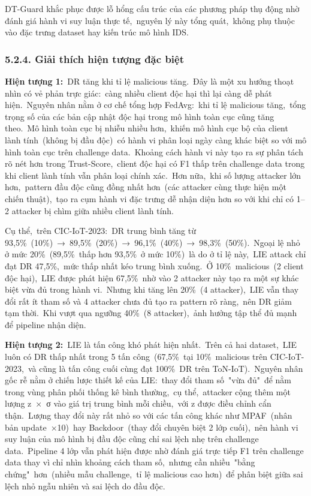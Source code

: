 DT-Guard khắc phục được lỗ hổng cấu trúc của các phương pháp thụ động nhờ đánh giá hành vi suy luận thực tế,~nguyên lý này tổng quát,~không phụ thuộc vào đặc trưng dataset hay kiến trúc mô hình IDS.

\subsubsection{5.2.4. Giải thích hiện tượng đặc biệt}\label{giux1ea3i-thuxedch-hiux1ec7n-tux1b0ux1ee3ng-ux111ux1eb7c-biux1ec7t}

\textbf{Hiện tượng 1:}~DR tăng khi tỉ lệ malicious tăng.~Đây là một xu hướng thoạt nhìn có vẻ phản trực giác:~càng nhiều client độc hại thì lại càng dễ phát hiện.~Nguyên nhân nằm ở cơ chế tổng hợp FedAvg:~khi tỉ lệ malicious tăng,~tổng trọng số của các bản cập nhật độc hại trong mô hình toàn cục cũng tăng theo.~Mô hình toàn cục bị nhiễu nhiều hơn,~khiến mô hình cục bộ của client lành tính~(không bị đầu độc)~có hành vi phân loại ngày càng khác biệt so với mô hình toàn cục trên challenge data.~Khoảng cách hành vi này tạo ra sự phân tách rõ nét hơn trong Trust-Score,~client độc hại có F1 thấp trên challenge data trong khi client lành tính vẫn phân loại chính xác.~Hơn nữa,~khi số lượng attacker lớn hơn,~pattern đầu độc cũng đồng nhất hơn~(các attacker cùng thực hiện một chiến thuật),~tạo ra cụm hành vi đặc trưng dễ nhận diện hơn so với khi chỉ có 1--2 attacker bị chìm giữa nhiều client lành tính.

Cụ thể,~trên CIC-IoT-2023:~DR trung bình tăng từ 93,5\%~(10\%)~→~89,5\%~(20\%)~→~96,1\%~(40\%)~→~98,3\%~(50\%).~Ngoại lệ nhỏ ở mức 20\%~(89,5\%~thấp hơn 93,5\%~ở mức 10\%)~là do ở tỉ lệ này,~LIE attack chỉ đạt DR 47,5\%,~mức thấp nhất kéo trung bình xuống.~Ở 10\%~malicious~(2 client độc hại),~LIE được phát hiện 67,5\%~nhờ vào 2 attacker này tạo ra một sự khác biệt vừa đủ trong hành vi.~Nhưng khi tăng lên 20\%~(4 attacker),~LIE vẫn thay đổi rất ít tham số và 4 attacker chưa đủ tạo ra pattern rõ ràng,~nên DR giảm tạm thời.~Khi vượt qua ngưỡng 40\%~(8 attacker),~ảnh hưởng tập thể đủ mạnh để pipeline nhận diện.

\textbf{Hiện tượng 2:}~LIE là tấn công khó phát hiện nhất.~Trên cả hai dataset,~LIE luôn có DR thấp nhất trong 5 tấn công~(67,5\%~tại 10\%~malicious trên CIC-IoT-2023,~và cũng là tấn công cuối cùng đạt 100\%~DR trên ToN-IoT).~Nguyên nhân gốc rễ nằm ở chiến lược thiết kế của LIE:~thay đổi tham số~"vừa đủ"~để nằm trong vùng phân phối thống kê bình thường,~cụ thể,~attacker cộng thêm một lượng z~×~σ vào giá trị trung bình mỗi chiều,~với z được điều chỉnh cẩn thận.~Lượng thay đổi này rất nhỏ so với các tấn công khác như MPAF~(nhân bản update~×10)~hay Backdoor~(thay đổi chuyên biệt 2 lớp cuối),~nên hành vi suy luận của mô hình bị đầu độc cũng chỉ sai lệch nhẹ trên challenge data.~Pipeline 4 lớp vẫn phát hiện được nhờ đánh giá trực tiếp F1 trên challenge data thay vì chỉ nhìn khoảng cách tham số,~nhưng cần nhiều~"bằng chứng"~hơn~(nhiều mẫu challenge,~tỉ lệ malicious cao hơn)~để phân biệt giữa sai lệch nhỏ ngẫu nhiên và sai lệch do đầu độc.


